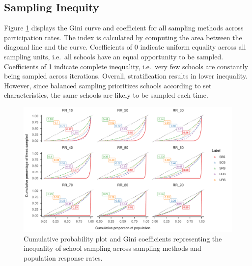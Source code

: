 \documentclass[
  man,floatsintext]{apa6}
\begin{document}
\newpage

\hypertarget{inequity-results}{%
\subsection{Sampling Inequity}\label{inequity-results}}

Figure \ref{fig:fig-gini-curve} displays the Gini curve and coefficient for all sampling methods across participation rates. The index is calculated by computing the area between the diagonal line and the curve. Coefficients of 0 indicate uniform equality across all sampling units, i.e.~all schools have an equal opportunity to be sampled. Coefficients of 1 indicate complete inequality, i.e.~very few schools are constantly being sampled across iterations. Overall, stratification results in lower inequality. However, since balanced sampling prioritizes schools according to set characteristics, the same schools are likely to be sampled each time.



\begin{figure}
\includegraphics{6---Paper_files/figure-latex/fig-gini-curve-1} \caption{Cumulative probability plot and Gini coefficients representing the inequality of school sampling across sampling methods and population response rates.}\label{fig:fig-gini-curve}
\end{figure}
\end{document}
